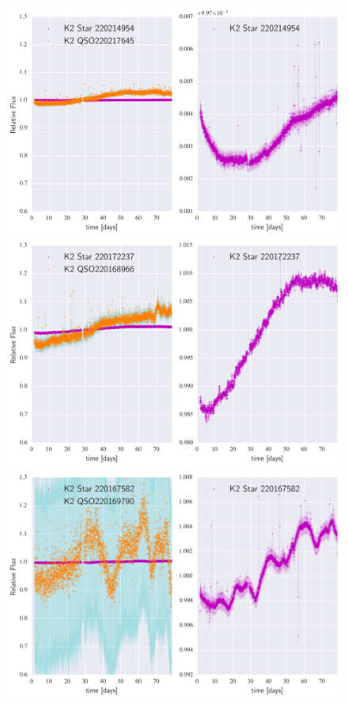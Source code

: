 \documentclass[a4paper,fleqn,usenatbib]{mnras}
\begin{document}
        	\begin{figure}
 	\includegraphics[width=\columnwidth]{220217645NearestNeighbor.png}
 	\includegraphics[width=\columnwidth]{220168966NearestNeighbor.png}
 	\includegraphics[width=\columnwidth]{220169790NearestNeighbor.png}
        		\caption{}
        		\label{fig:example_figure}
        	\end{figure}   
        	
\end{document}
